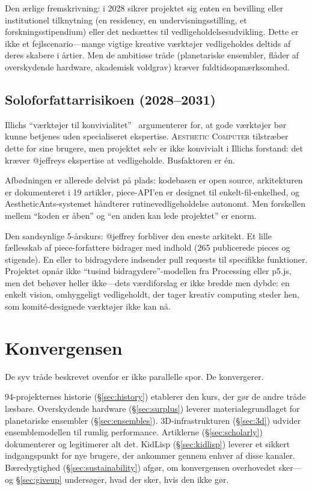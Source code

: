 \documentclass[10pt,letterpaper,twocolumn]{article}
\newcommand{\ac}{\textsc{Aesthetic Computer}}
\begin{document}
Den ærlige fremskrivning: i 2028 sikrer projektet sig enten en bevilling eller institutionel tilknytning (en residency, en undervisningsstilling, et forskningsstipendium) eller det nedsættes til vedligeholdelsesudvikling. Dette er ikke et fejlscenario---mange vigtige kreative værktøjer vedligeholdes deltids af deres skabere i årtier. Men de ambitiøse tråde (planetariske ensembler, flåder af overskydende hardware, akademisk voldgrav) kræver fuldtidsopmærksomhed.

\subsection{Soloforfattarrisikoen (2028--2031)}

Illichs ``værktøjer til konvivialitet''~\citep{illich1973tools} argumenterer for, at gode værktøjer bør kunne betjenes uden specialiseret ekspertise. \ac{} tilstræber dette for sine brugere, men projektet selv er ikke konvivialt i Illichs forstand: det kræver @jeffreys ekspertise at vedligeholde. Busfaktoren er én.

Afbødningen er allerede delvist på plads: kodebasen er open source, arkitekturen er dokumenteret i 19 artikler, piece-API'en er designet til enkelt-fil-enkelhed, og AestheticAnts-systemet håndterer rutinevedligeholdelse autonomt. Men forskellen mellem ``koden er åben'' og ``en anden kan lede projektet'' er enorm.

Den sandsynlige 5-årskurs: @jeffrey forbliver den eneste arkitekt. Et lille fællesskab af piece-forfattere bidrager med indhold (265 publicerede pieces og stigende). En eller to bidragydere indsender pull requests til specifikke funktioner. Projektet opnår ikke ``tusind bidragydere''-modellen fra Processing eller p5.js, men det behøver heller ikke---dets værdiforslag er ikke bredde men dybde: en enkelt vision, omhyggeligt vedligeholdt, der tager kreativ computing steder hen, som komité-designede værktøjer ikke kan nå.


\section{Konvergensen}
\label{sec:convergence}

De syv tråde beskrevet ovenfor er ikke parallelle spor. De konvergerer.

94-projekternes historie (\S\ref{sec:history}) etablerer den kurs, der gør de andre tråde læsbare. Overskydende hardware (\S\ref{sec:surplus}) leverer materialegrundlaget for planetariske ensembler (\S\ref{sec:ensembles}). 3D-infrastrukturen (\S\ref{sec:3d}) udvider ensemblemodellen til rumlig performance. Artiklerne (\S\ref{sec:scholarly}) dokumenterer og legitimerer alt det. KidLisp (\S\ref{sec:kidlisp}) leverer et sikkert indgangspunkt for nye brugere, der ankommer gennem enhver af disse kanaler. Bæredygtighed (\S\ref{sec:sustainability}) afgør, om konvergensen overhovedet sker---og \S\ref{sec:giveup} undersøger, hvad der sker, hvis den ikke gør.
\end{document}
